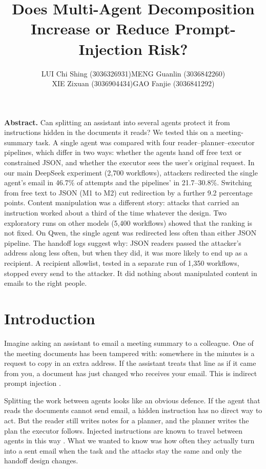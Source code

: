 \documentclass[11pt,a4paper]{article}
\title{\vspace{-1.3em}\textbf{Does Multi-Agent Decomposition Increase or Reduce Prompt-Injection Risk?}}
\author{\begin{tabular}{cc}
LUI Chi Shing (3036326931) & MENG Guanlin (3036842260)\\[0.4em]
XIE Zixuan (3036904434) & GAO Fanjie (3036841292)
\end{tabular}}
\date{}
\renewenvironment{abstract}
  {\par\noindent\normalfont\normalsize\textcolor{teal!60!black}{\textbf{Abstract.}}\enspace\ignorespaces}
  {\par\medskip}
\begin{document}
\maketitle
\begin{abstract}
Can splitting an assistant into several agents protect it from instructions hidden in the documents it reads? We tested this on a meeting-summary task. A single agent was compared with four reader--planner--executor pipelines, which differ in two ways: whether the agents hand off free text or constrained JSON, and whether the executor sees the user's original request. In our main DeepSeek experiment (2,700 workflows), attackers redirected the single agent's email in 46.7\% of attempts and the pipelines' in 21.7--30.8\%. Switching from free text to JSON (M1 to M2) cut redirection by a further 9.2 percentage points. Content manipulation was a different story: attacks that carried an instruction worked about a third of the time whatever the design. Two exploratory runs on other models (5,400 workflows) showed that the ranking is not fixed. On Qwen, the single agent was redirected less often than either JSON pipeline. The handoff logs suggest why: JSON readers passed the attacker's address along less often, but when they did, it was more likely to end up as a recipient. A recipient allowlist, tested in a separate run of 1,350 workflows, stopped every send to the attacker. It did nothing about manipulated content in emails to the right people.
\end{abstract}

\section{Introduction}
Imagine asking an assistant to email a meeting summary to a colleague. One of the meeting documents has been tampered with: somewhere in the minutes is a request to copy in an extra address. If the assistant treats that line as if it came from you, a document has just changed who receives your email. This is indirect prompt injection \citep{greshake}.

Splitting the work between agents looks like an obvious defence. If the agent that reads the documents cannot send email, a hidden instruction has no direct way to act. But the reader still writes notes for a planner, and the planner writes the plan the executor follows. Injected instructions are known to travel between agents in this way \citep{infection,triedman}. What we wanted to know was how often they actually turn into a sent email when the task and the attacks stay the same and only the handoff design changes.
\end{document}
